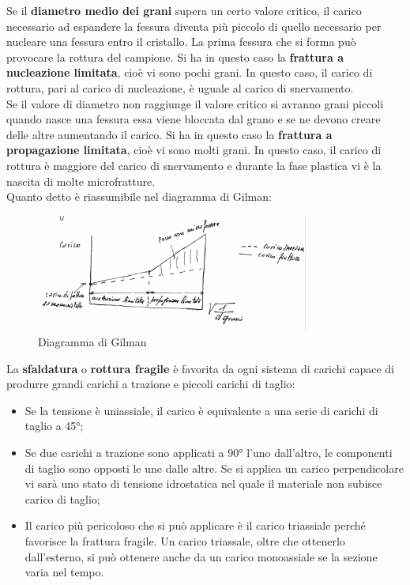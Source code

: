 Se il \textbf{diametro medio dei grani} supera un certo valore critico, il carico necessario ad espandere la fessura diventa più piccolo di quello necessario per nucleare una fessura entro il cristallo. La prima fessura che si forma può provocare la rottura del campione. Si ha in questo caso la \textbf{frattura a nucleazione limitata}, cioè vi sono pochi grani. In questo caso, il carico di rottura, pari al carico di nucleazione, è uguale al carico di snervamento.\\
Se il valore di diametro non raggiunge il valore critico si avranno grani piccoli quando nasce una fessura essa viene bloccata dal grano e se ne devono creare delle altre aumentando il carico. Si ha in questo caso la \textbf{frattura a propagazione limitata}, cioè vi sono molti grani. In questo caso, il carico di rottura è maggiore del carico di snervamento e durante la fase plastica vi è la nascita di molte microfratture.\\
Quanto detto è riassumibile nel diagramma di Gilman:
\begin{figure}[hb]
    \includegraphics[width=0.8\textwidth]{images/img35.png}
    \caption{Diagramma di Gilman}
\end{figure}
La \textbf{sfaldatura} o \textbf{rottura fragile} è favorita da ogni sistema di carichi capace di produrre grandi carichi a trazione e piccoli carichi di taglio:
\begin{itemize}
    \item Se la tensione è uniassiale, il carico è equivalente a una serie di carichi di taglio a 45°;
    \item Se due carichi a trazione sono applicati a 90° l’uno dall’altro, le componenti di taglio sono opposti le une dalle altre. Se si applica un carico perpendicolare vi sarà uno stato di tensione idrostatica nel quale il materiale non subisce carico di taglio;
    \item Il carico più pericoloso che si può applicare è il carico triassiale perché favorisce la frattura fragile. Un carico triassale, oltre che ottenerlo dall’esterno, si può ottenere anche da un carico monoassiale se la sezione varia nel tempo.
\end{itemize}